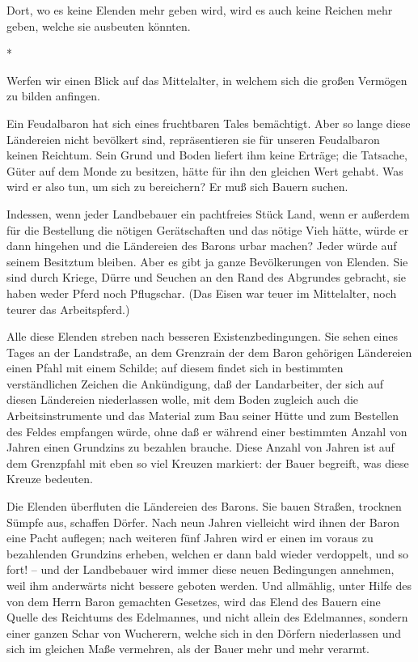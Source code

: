 \documentclass{scrbook}
\begin{document}
Dort, wo es keine Elenden mehr geben wird, wird es auch keine Reichen mehr geben, welche sie ausbeuten könnten.

\begin{center}*\end{center}

Werfen wir einen Blick auf das Mittelalter, in welchem sich die großen Vermögen zu bilden anfingen.

Ein Feudalbaron hat sich eines fruchtbaren Tales bemächtigt. Aber so lange diese Ländereien nicht bevölkert sind, repräsentieren sie für unseren Feudalbaron keinen Reichtum. Sein Grund und Boden liefert ihm keine Erträge; die Tatsache, Güter auf dem Monde zu besitzen, hätte für ihn den gleichen Wert gehabt. Was wird er also tun, um sich zu bereichern? Er muß sich Bauern suchen.

Indessen, wenn jeder Landbebauer ein pachtfreies Stück Land, wenn er außerdem für die Bestellung die nötigen Gerätschaften und das nötige Vieh hätte, würde er dann hingehen und die Ländereien des Barons urbar machen? Jeder würde auf seinem Besitztum bleiben. Aber es gibt ja ganze Bevölkerungen von Elenden. Sie sind durch Kriege, Dürre und Seuchen an den Rand des Abgrundes gebracht, sie haben weder Pferd noch Pflugschar. (Das Eisen war teuer im Mittelalter, noch teurer das Arbeitspferd.)

Alle diese Elenden streben nach besseren Existenzbedingungen. Sie sehen eines Tages an der Landstraße, an dem Grenzrain der dem Baron gehörigen Ländereien einen Pfahl mit einem Schilde; auf diesem findet sich in bestimmten verständlichen Zeichen die Ankündigung, daß der Landarbeiter, der sich auf diesen Ländereien niederlassen wolle, mit dem Boden zugleich auch die Arbeitsinstrumente und das Material zum Bau seiner Hütte und zum Bestellen des Feldes empfangen würde, ohne daß er während einer bestimmten Anzahl von Jahren einen Grundzins zu bezahlen brauche. Diese Anzahl von Jahren ist auf dem Grenzpfahl mit eben so viel Kreuzen markiert: der Bauer begreift, was diese Kreuze bedeuten.

Die Elenden überfluten die Ländereien des Barons. Sie bauen Straßen, trocknen Sümpfe aus, schaffen Dörfer. Nach neun Jahren vielleicht wird ihnen der Baron eine Pacht auflegen; nach weiteren fünf Jahren wird er einen im voraus zu bezahlenden Grundzins erheben, welchen er dann bald wieder verdoppelt, und so fort! – und der Landbebauer wird immer diese neuen Bedingungen annehmen, weil ihm anderwärts nicht bessere geboten werden. Und allmählig, unter Hilfe des von dem Herrn Baron gemachten Gesetzes, wird das Elend des Bauern eine Quelle des Reichtums des Edelmannes, und nicht allein des Edelmannes, sondern einer ganzen Schar von Wucherern, welche sich in den Dörfern niederlassen und sich im gleichen Maße vermehren, als der Bauer mehr und mehr verarmt.
\end{document}

